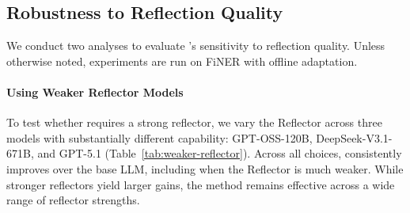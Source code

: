 \begin{table}[!tbhp]
  \centering
  \small
  \caption{\textbf{Evaluation-Stage Average Cost Statistics on AppWorld.} The percentages compare \name against GEPA.}
  \label{tab:cost-eval-average}
\end{table}


\subsection{Robustness to Reflection Quality}
\label{subsec:robust-reflection}

We conduct two analyses to evaluate \name's sensitivity to reflection quality. Unless otherwise noted, experiments are run on FiNER with \name offline adaptation.

\paragraph{Using Weaker Reflector Models} 
To test whether \name requires a strong reflector, we vary the Reflector across three models with substantially different capability: GPT-OSS-120B, DeepSeek-V3.1-671B, and GPT-5.1 (Table~\ref{tab:weaker-reflector}). 
Across all choices, \name consistently improves over the base LLM, including when the Reflector is much weaker. 
While stronger reflectors yield larger gains, the method remains effective across a wide range of reflector strengths.

